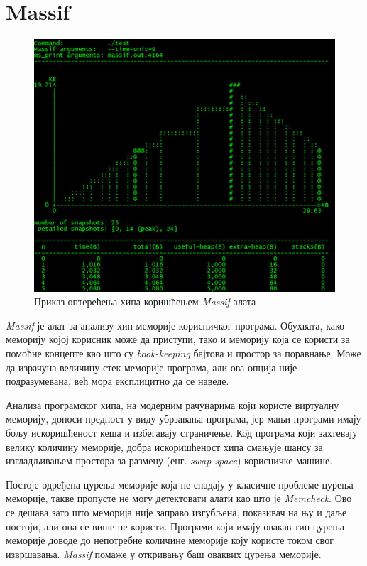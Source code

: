 \documentclass[12pt,oneside]{memoir}
\begin{document}
\section{Massif}
\label{section_massif}

\begin{figure}[h!]
\begin{center}
\includegraphics[scale=0.75]{slika19.png}
\end{center}
\caption{Приказ оптерећења хипа коришћењем \textit{Massif} алата}
\label{fig:massif}
\end{figure}

\indent \textit{Massif} је алат за анализу хип меморије корисничког програма. Обухвата, како меморију којој корисник може да приступи, тако и меморију која се користи за помоћне концепте као што су \textit{book-keeping} бајтова и простор за поравнање. Може да израчуна величину стек меморије програма, али ова опција није подразумевана, већ мора експлицитно да се наведе.

\indent Анализа програмског хипа, на модерним рачунарима који користе виртуалну меморију, доноси предност у виду убрзавања програма, јер мањи програми имају бољу искоришћеност кеша и избегавају страничење. К\^{о}д програма који захтевају велику количину меморије, добра искоришћеност хипа смањује шансу за изгладљивањем простора за размену (енг. \textit{swap space}) корисничке машине.

\indent Постоје одређена цурења меморије која не спадају у класичне проблеме цурења меморије, такве пропусте не могу детектовати алати као што је \textit{Memcheck}. Ово се дешава зато што меморија није заправо изгубљена, показивач на њу и даље постоји, али она се више не користи. Програми који имају овакав тип цурења меморије доводе до непотребне количине меморије коју користе током свог извршавања. \textit{Massif} помаже у откривању баш оваквих цурења меморије. 
\end{document}
